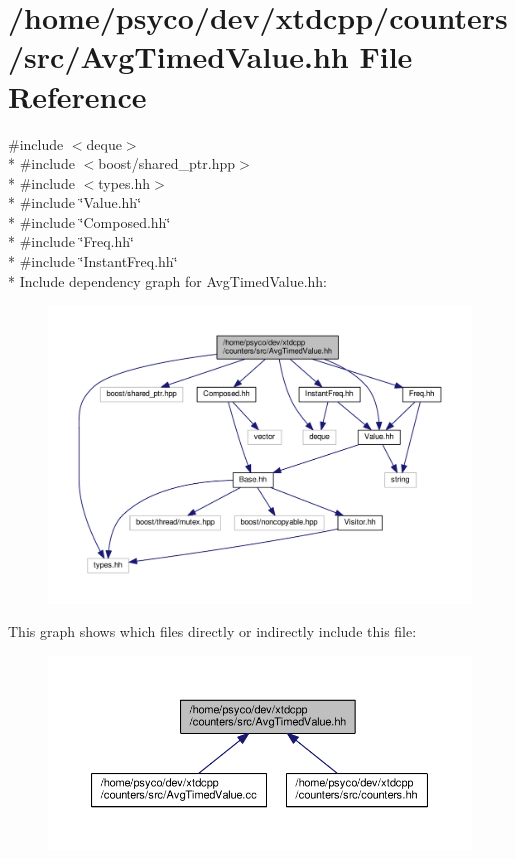 \hypertarget{AvgTimedValue_8hh}{}\section{/home/psyco/dev/xtdcpp/counters/src/\+Avg\+Timed\+Value.hh File Reference}
\label{AvgTimedValue_8hh}
{\ttfamily \#include $<$deque$>$}\\*
{\ttfamily \#include $<$boost/shared\+\_\+ptr.\+hpp$>$}\\*
{\ttfamily \#include $<$types.\+hh$>$}\\*
{\ttfamily \#include \char`\"{}Value.\+hh\char`\"{}}\\*
{\ttfamily \#include \char`\"{}Composed.\+hh\char`\"{}}\\*
{\ttfamily \#include \char`\"{}Freq.\+hh\char`\"{}}\\*
{\ttfamily \#include \char`\"{}Instant\+Freq.\+hh\char`\"{}}\\*
Include dependency graph for Avg\+Timed\+Value.\+hh\+:
\nopagebreak
\begin{figure}[H]
\begin{center}
\leavevmode
\includegraphics[width=350pt]{AvgTimedValue_8hh__incl}
\end{center}
\end{figure}
This graph shows which files directly or indirectly include this file\+:
\nopagebreak
\begin{figure}[H]
\begin{center}
\leavevmode
\includegraphics[width=350pt]{AvgTimedValue_8hh__dep__incl}
\end{center}
\end{figure}
